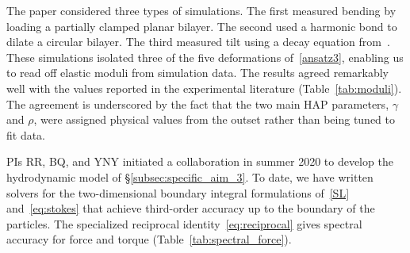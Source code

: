 \begin{table}
  \vspace{-6pt}
\vspace{-8pt}
\caption{\label{tab:spectral_force} 
\footnotesize  Relative numerical errors (rel.~err.)$_F = \max_{i}
  \|\mathbf{F}_i-\mathbf{F}_i^{\text{exact}}\|/\|\mathbf{F}_i^{\text{exact}}\|$
  and (rel.~err.)$_G = \max_{i}
  \|\mathbf{G}_i-\mathbf{G}_i^{\text{exact}}\|/\|\mathbf{G}_i^{\text{exact}}\|$
  for force and torque, respectively, as a function of number of grid
  points $n$ per particle. The data is for $N = 5$ particles; two of the
  particles are nearly touching at a distance of 1\% of the particle
  diameter.} 
\end{table}
The paper \cite{Fu2018_SIAM} considered three types of simulations. The first measured bending by
loading a partially clamped planar bilayer. The second used a harmonic
bond to dilate a circular bilayer. The third measured tilt using a decay
equation from~\cite{KUZMIN2005}. These simulations isolated three of the
five deformations of~\eqref{ansatz3}, enabling us to read off elastic
moduli from simulation data. The results agreed remarkably well with the
values reported in the experimental literature (Table~\ref{tab:moduli}).
The agreement is underscored by the fact that the two main HAP
parameters, $\gamma$ and $\rho$, were assigned physical values from the
outset rather than being tuned to fit data. 

PIs RR, BQ, and YNY initiated a collaboration in summer 2020 to develop
the hydrodynamic model of \S\ref{subsec:specific_aim_3}. To date, we
have written solvers for the two-dimensional boundary integral
formulations of~\eqref{SL} and~\eqref{eq:stokes} that achieve
third-order accuracy up to the boundary of the particles. The
specialized reciprocal identity~\eqref{eq:reciprocal} gives spectral
accuracy for force and torque (Table~\ref{tab:spectral_force}).

